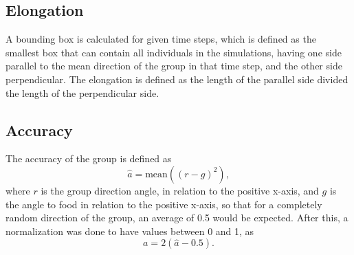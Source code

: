 \subsection{Elongation} %
\label{sub:elongation}
A bounding box is calculated for given time steps, which is defined as the smallest box that can contain all individuals in the simulations, having one side parallel to the mean direction of the group in that time step, and the other side perpendicular.
The elongation is defined as the length of the parallel side divided the length of the perpendicular side.

\subsection{Accuracy} %
\label{sub:accuracy}
The accuracy of the group is defined as 
\begin{equation}
	\hat{a} = \text{mean} ((r - g)^2),
\end{equation}
where $r$ is the group direction angle, in relation to the positive x-axis, and $g$ is the angle to food in relation to the positive x-axis, so that for a completely random direction of the group, an average of 0.5 would be expected. After this, a normalization was done to have values between 0 and 1, as
\begin{equation}
	a = 2(\hat{a} - 0.5).
\end{equation}
